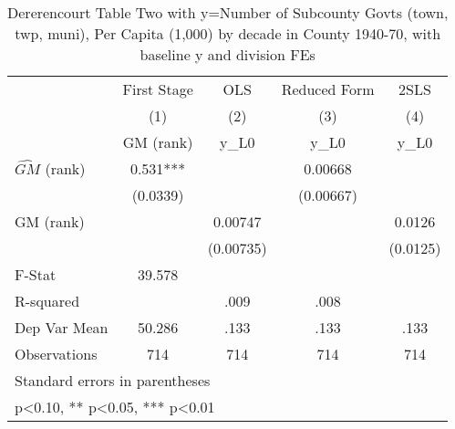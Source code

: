 \begin{table}[htbp]\centering
\def\sym#1{\ifmmode^{#1}\else\(^{#1}\)\fi}
\caption{Dererencourt Table Two with y=Number of Subcounty Govts (town, twp, muni), Per Capita (1,000) by decade in County 1940-70, with baseline y and division FEs}
\begin{tabular}{l*{4}{c}}
\toprule
                    & First Stage   &         OLS   &Reduced Form   &        2SLS   \\
                    &\multicolumn{1}{c}{(1)}&\multicolumn{1}{c}{(2)}&\multicolumn{1}{c}{(3)}&\multicolumn{1}{c}{(4)}\\
                    &\multicolumn{1}{c}{GM  (rank)}&\multicolumn{1}{c}{y\_L0}&\multicolumn{1}{c}{y\_L0}&\multicolumn{1}{c}{y\_L0}\\
\midrule
$\hat{GM}$ (rank)   &       0.531***&               &     0.00668   &               \\
                    &    (0.0339)   &               &   (0.00667)   &               \\
\addlinespace
GM  (rank)          &               &     0.00747   &               &      0.0126   \\
                    &               &   (0.00735)   &               &    (0.0125)   \\
\midrule
F-Stat              &      39.578   &               &               &               \\
R-squared           &               &        .009   &        .008   &               \\
Dep Var Mean        &      50.286   &        .133   &        .133   &        .133   \\
Observations        &         714   &         714   &         714   &         714   \\
\bottomrule
\multicolumn{5}{l}{\footnotesize Standard errors in parentheses}\\
\multicolumn{5}{l}{\footnotesize * p<0.10, ** p<0.05, *** p<0.01}\\
\end{tabular}
\end{table}
